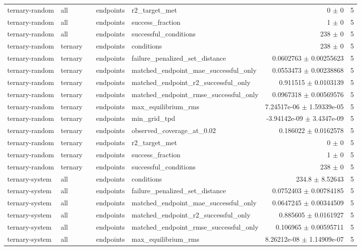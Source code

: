 \begin{tabular}{lllllrr}
ternary-random & all &  & endpoints & r2_target_met & 0 $\pm$ 0 & 5 \\
ternary-random & all &  & endpoints & success_fraction & 1 $\pm$ 0 & 5 \\
ternary-random & all &  & endpoints & successful_conditions & 238 $\pm$ 0 & 5 \\
ternary-random & ternary &  & endpoints & conditions & 238 $\pm$ 0 & 5 \\
ternary-random & ternary &  & endpoints & failure_penalized_set_distance & 0.0602763 $\pm$ 0.00255623 & 5 \\
ternary-random & ternary &  & endpoints & matched_endpoint_mae_successful_only & 0.0553473 $\pm$ 0.00238868 & 5 \\
ternary-random & ternary &  & endpoints & matched_endpoint_r2_successful_only & 0.911515 $\pm$ 0.0103139 & 5 \\
ternary-random & ternary &  & endpoints & matched_endpoint_rmse_successful_only & 0.0967318 $\pm$ 0.00569576 & 5 \\
ternary-random & ternary &  & endpoints & max_equilibrium_rms & 7.24517e-06 $\pm$ 1.59339e-05 & 5 \\
ternary-random & ternary &  & endpoints & min_grid_tpd & -3.94142e-09 $\pm$ 3.4347e-09 & 5 \\
ternary-random & ternary &  & endpoints & observed_coverage_at_0.02 & 0.186022 $\pm$ 0.0162578 & 5 \\
ternary-random & ternary &  & endpoints & r2_target_met & 0 $\pm$ 0 & 5 \\
ternary-random & ternary &  & endpoints & success_fraction & 1 $\pm$ 0 & 5 \\
ternary-random & ternary &  & endpoints & successful_conditions & 238 $\pm$ 0 & 5 \\
ternary-system & all &  & endpoints & conditions & 234.8 $\pm$ 8.52643 & 5 \\
ternary-system & all &  & endpoints & failure_penalized_set_distance & 0.0752403 $\pm$ 0.00784185 & 5 \\
ternary-system & all &  & endpoints & matched_endpoint_mae_successful_only & 0.0647245 $\pm$ 0.00344509 & 5 \\
ternary-system & all &  & endpoints & matched_endpoint_r2_successful_only & 0.885605 $\pm$ 0.0161927 & 5 \\
ternary-system & all &  & endpoints & matched_endpoint_rmse_successful_only & 0.106965 $\pm$ 0.00595711 & 5 \\
ternary-system & all &  & endpoints & max_equilibrium_rms & 8.26212e-08 $\pm$ 1.14909e-07 & 5 \\

\end{tabular}
